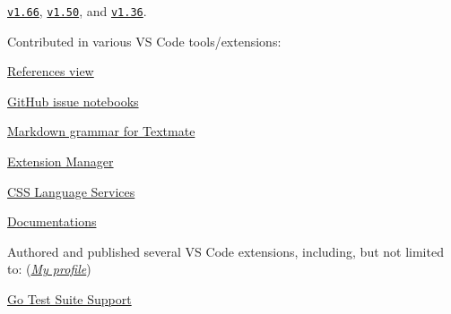 \documentclass[9pt,a4paper]{extarticle}
\begin{document}
\begin{customitemize}
\begin{customitemize}
\begin{customitemize}
{                        \href{https://github.com/microsoft/vscode-docs/blob/c7cde00e8e3bc0a3f1c87cfe14a46ad425e6c0c0/release-notes/v1_66.md\#pull-requests}{\texttt{v1.66}},
                        \href{https://github.com/microsoft/vscode-docs/blob/c52893f1c6d611e6f1f09838db922ea4453c3933/release-notes/v1_50.md\#thank-you}{\texttt{v1.50}}, and
                        \href{https://github.com/microsoft/vscode-docs/blob/723adc3cdf3afca7f7cea071c03d86dc02736c2c/release-notes/v1_36.md\#thank-you}{\texttt{v1.36}}.}
            \item{Contributed in various VS Code tools/extensions:}
            \begin{customitemize}
                \item{\href{https://github.com/microsoft/vscode-references-view/pulls?q=is\%3Apr+author\%3Ababakks}{References view }}
                \item{\href{https://github.com/microsoft/vscode-github-issue-notebooks/pulls?q=is\%3Apr+author\%3Ababakks}{GitHub issue notebooks }}
                \item{\href{https://github.com/microsoft/vscode-markdown-tm-grammar/pulls?q=is%3Apr+author%3Ababakks}{Markdown grammar for Textmate \repo{microsoft/vscode-markdown-tm-grammar}}}
                \item{\href{https://github.com/microsoft/vscode-vsce/pulls?q=is\%3Apr+author\%3Ababakks}{Extension Manager }}
                \item{\href{https://github.com/microsoft/vscode-css-languageservice/pulls?q=is\%3Apr+author\%3Ababakks}{CSS Language Services }}
                \item{\href{https://github.com/microsoft/vscode-docs/pulls?q=is\%3Apr+author\%3Ababakks}{Documentations }}
            \end{customitemize}
            \item{Authored and published several VS Code extensions, including, but not limited to: (\href{https://marketplace.visualstudio.com/publishers/babakks}{\textit{My profile}})}
            \begin{customitemize}
                \item{\href{https://marketplace.visualstudio.com/items?itemName=babakks.vscode-go-test-suite}{Go Test Suite Support} }

\end{customitemize}
\end{customitemize}
\end{customitemize}
\end{customitemize}
\end{document}
